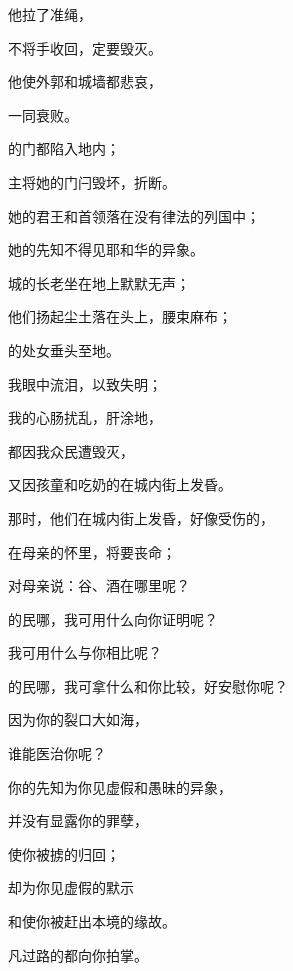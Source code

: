 {\par }{\Q 他拉了准绳，
\par }{\Q 不将手收回，定要毁灭。
\par }{\Q 他使外郭和城墙都悲哀，
\par }{\Q 一同衰败。
\par }{\BB \par }{\Q {}的门都陷入地内；
\par }{\Q 主将她的门闩毁坏，折断。
\par }{\Q 她的君王和首领落在没有律法的列国中；
\par }{\Q 她的先知不得见耶和华的异象。
\par }{\BB \par }{\Q {}城的长老坐在地上默默无声；
\par }{\Q 他们扬起尘土落在头上，腰束麻布；
\par }{的处女垂头至地。
\par }{\BB \par }{\Q {}我眼中流泪，以致失明；
\par }{\Q 我的心肠扰乱，肝{}涂地，
\par }{\Q 都因我众民遭毁灭，
\par }{\Q 又因孩童和吃奶的在城内街上发昏。
\par }{\BB \par }{\Q {}那时，他们在城内街上发昏，好像受伤的，
\par }{\Q 在母亲的怀里，将要丧命；
\par }{\Q 对母亲说：谷、酒在哪里呢？
\par }{\BB \par }{\Q {}的民哪，我可用什么向你证明呢？
\par }{\Q 我可用什么与你相比呢？
\par }{的民哪，我可拿什么和你比较，好安慰你呢？
\par }{\Q 因为你的裂口大如海，
\par }{\Q 谁能医治你呢？
\par }{\BB \par }{\Q {}你的先知为你见虚假和愚昧的异象，
\par }{\Q 并没有显露你的罪孽，
\par }{\Q 使你被掳的归回；
\par }{\Q 却为你见虚假的默示
\par }{\Q 和使你被赶出本境的缘故。
\par }{\BB \par }{\Q {}凡过路的都向你拍掌。
}
